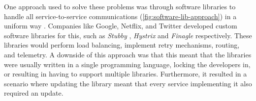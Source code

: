 One approach used to solve these problems was through software libraries to handle all service-to-service communications (\cref{fig:software-lib-approach}) in a uniform way \cite{service-mesh-history}. Companies like Google, Netflix, and Twitter developed custom software libraries for this, such as \textit{Stubby} \cite{stubby}, \textit{Hystrix} \cite{hystrix} and \textit{Finagle} \cite{finagle} respectively. These libraries would perform load balancing, implement retry mechanisms, routing, and telemetry. A downside of this approach was that this meant that the libraries were usually written in a single programming language, locking the developers in, or resulting in having to support multiple libraries. Furthermore, it resulted in a scenario where updating the library meant that every service implementing it also required an update. 




